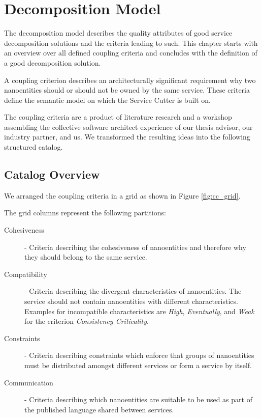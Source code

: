 \chapter{Decomposition Model}
\label{cha:decomposition}

The decomposition model describes the quality attributes of good service decomposition solutions and the criteria leading to such. This chapter starts with an overview over all defined coupling criteria and concludes with the definition of a good decomposition solution. 

A coupling criterion describes an architecturally significant requirement why two nanoentities should or should not be owned by the same service. These criteria define the semantic model on which the Service Cutter is built on. 

The coupling criteria are a product of literature research and a workshop assembling the collective software architect experience of our thesis advisor, our industry partner, and us. We transformed the resulting ideas into the following structured catalog.

\section{Catalog Overview}
\label{subsec:couplingCriteriaOverview}

We arranged the coupling criteria in a grid as shown in Figure \ref{fig:cc_grid}.

The grid columns represent the following partitions:

\begin{description}
	\item[Cohesiveness] - Criteria describing the cohesiveness of nanoentities and therefore why they should belong to the same service. 
	\item[Compatibility] - Criteria describing the divergent characteristics of nanoentities. The service should not contain nanoentities with different characteristics. Examples for incompatible characteristics are \textit{High}, \textit{Eventually}, and \textit{Weak} for the criterion \textit{Consistency Criticality}.
	\item[Constraints] - Criteria describing constraints which enforce that groups of nanoentities must be distributed amongst different services or form a service by itself.
	\item[Communication] - Criteria describing which nanoentities are suitable to be used as part of the published language shared between services. 
\end{description}

